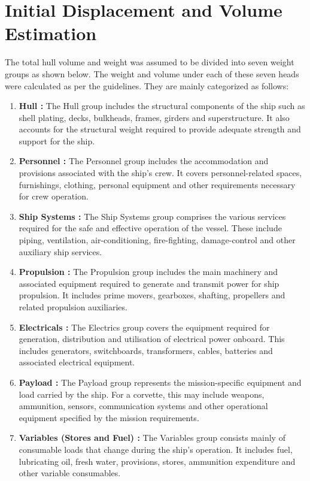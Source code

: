 \documentclass[12pt,a4paper,twoside]{report}
\begin{document}
\section{Initial Displacement and Volume Estimation}The total hull volume and weight was assumed to be divided into seven weight groups as shown below. The weight and volume under each of these seven heads were calculated as per the guidelines. They are mainly categorized as follows:
\begin{enumerate}[\alph*)]
    \item \textbf{Hull : }The Hull group includes the structural components of the ship such as shell plating, decks, bulkheads, frames, girders and superstructure. It also accounts for the structural weight required to provide adequate strength and support for the ship.
    \item \textbf{Personnel : }The Personnel group includes the accommodation and provisions associated with the ship's crew. It covers personnel-related spaces, furnishings, clothing, personal equipment and other requirements necessary for crew operation.
    \item \textbf{Ship Systems : }The Ship Systems group comprises the various services required for the safe and effective operation of the vessel. These include piping, ventilation, air-conditioning, fire-fighting, damage-control and other auxiliary ship services.
    \item \textbf{Propulsion : }The Propulsion group includes the main machinery and associated equipment required to generate and transmit power for ship propulsion. It includes prime movers, gearboxes, shafting, propellers and related propulsion auxiliaries.
    \item \textbf{Electricals : }The Electrics group covers the equipment required for generation, distribution and utilisation of electrical power onboard. This includes generators, switchboards, transformers, cables, batteries and associated electrical equipment.
    \item \textbf{Payload : }The Payload group represents the mission-specific equipment and load carried by the ship. For a corvette, this may include weapons, ammunition, sensors, communication systems and other operational equipment specified by the mission requirements.
    \item  \textbf{Variables (Stores and Fuel) : }The Variables group consists mainly of consumable loads that change during the ship's operation. It includes fuel, lubricating oil, fresh water, provisions, stores, ammunition expenditure and other variable consumables.


\end{enumerate}
\end{document}

